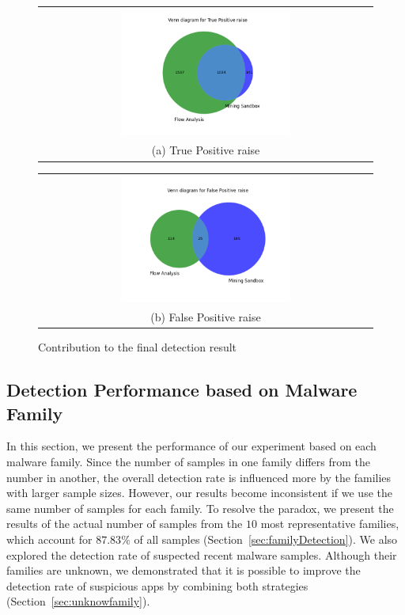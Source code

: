 \begin{figure}[t!]
  \centering
  \begin{tabular}{@{}c@{}}
    \includegraphics[width=0.52\textwidth]{image/vennTP.png} \\[\abovecaptionskip]
    \small (a) True Positive raise
  \end{tabular}

  \begin{tabular}{@{}c@{}}
    \includegraphics[width=0.52\textwidth]{image/vennFP.png} \\[\abovecaptionskip]
    \small (b) False Positive raise
  \end{tabular}

  \caption{Contribution to the final detection result}\label{fig:venn}
\end{figure}






\subsection{Detection Performance based on Malware Family}\label{sec:family}

In this section, we present the performance of our experiment based on each malware family. Since the number of samples in one family differs from the number in another, the overall detection rate is influenced more by the families with larger sample sizes. However, our results become inconsistent if we use the same number of samples for each family. To resolve the paradox, we present the results of the actual number of samples from the $10$ most representative families, which account for $87.83\%$ of all samples (Section~\ref{sec:familyDetection}). We also explored the detection rate of suspected recent malware samples. Although their families are unknown, we demonstrated that it is possible to improve the detection rate of suspicious apps by combining both strategies (Section~\ref{sec:unknowfamily}).


